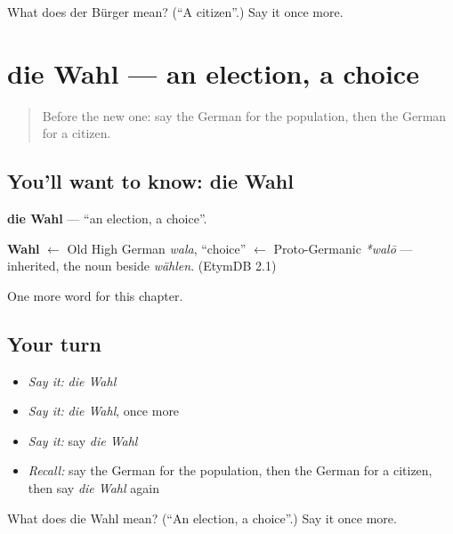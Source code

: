\begin{tcolorbox}[breakable,colback=teal!4,colframe=teal!35!black,title={Before you move on}]
What does der Bürger mean? (\textquotedblleft{}A citizen\textquotedblright{}.) Say it once more.
\end{tcolorbox}
\section[die Wahl]{die Wahl — an election, a choice}

\label{lesson:GE-C209-wahl}



\begin{quote}
Before the new one: say the German for the population, then the German for a citizen.
\end{quote}

\subsection*{You'll want to know: die Wahl}
\textbf{die Wahl} — \textquotedblleft{}an election, a choice\textquotedblright{}.

\begin{cousinweb}
\textbf{Wahl} $\leftarrow$ Old High German \emph{wala}, \textquotedblleft{}choice\textquotedblright{} $\leftarrow$ Proto-Germanic \emph{*walō} — inherited, the noun beside \emph{wählen}. (EtymDB 2.1)
\end{cousinweb}

\begin{grammarlens}[title={What you've built}]
One more word for this chapter.
\end{grammarlens}

\subsection*{Your turn}
\begin{itemize}
\raggedright
  \item \emph{Say it:} \emph{die Wahl}
  \item \emph{Say it:} \emph{die Wahl}, once more
  \item \emph{Say it:} say \emph{die Wahl}
  \item \emph{Recall:} say the German for the population, then the German for a citizen, then say \emph{die Wahl} again
\end{itemize}

\begin{tcolorbox}[breakable,colback=teal!4,colframe=teal!35!black,title={Before you move on}]
What does die Wahl mean? (\textquotedblleft{}An election, a choice\textquotedblright{}.) Say it once more.
\end{tcolorbox}

